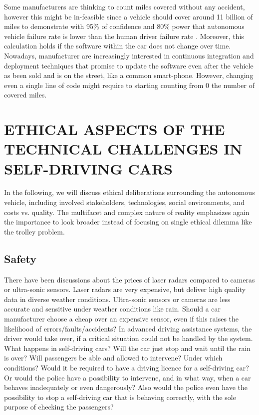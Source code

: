 Some manufacturers are thinking to count miles covered without any accident, however this might be in-feasible since a vehicle should cover around 11 billion of miles to demonstrate with 95\% of confidence and 80\% power that autonomous vehicle failure rate is lower than the human driver failure rate \cite{KALRA2016182}. Moreover, this calculation holds if the software within the car does not change over time. Nowadays, manufacturer are increasingly interested in continuous integration and deployment techniques that promise to update the software even after the vehicle as been sold and is on the street, like a common smart-phone. However, changing even a single line of code might require to starting counting from 0 the number of covered miles.


\section{ETHICAL ASPECTS OF THE TECHNICAL CHALLENGES IN SELF-DRIVING CARS}
\label{sec:EAofTC}

In the following, we will discuss ethical deliberations surrounding the autonomous vehicle, including involved stakeholders, technologies, social environments, and costs vs. quality. The multifacet and complex nature of reality emphasizes again the importance to look broader instead of focusing on single ethical dilemma like the trolley problem.

\subsection{Safety}
\label{sec:EAofTC:Safety}

There have been discussions about the prices of laser radars compared to cameras or ultra-sonic sensors. Laser radars are very expensive, but deliver high quality data in diverse weather conditions. Ultra-sonic sensors or cameras are less accurate and sensitive under weather conditions like rain. 
Should a car manufacturer choose a cheap over an expensive sensor, even if this raises the likelihood of errors/faults/accidents? In advanced driving assistance systems, the driver would take over, if a critical situation could not be handled by the system. What happens in self-driving cars? Will the car just stop and wait until the rain is over? Will passengers be able and allowed to intervene? Under which conditions? Would it be required to have a driving licence for a self-driving car? Or would the police have a possibility to intervene, and in what way, when a car behaves inadequately or even dangerously? Also would the police even have the possibility to stop a self-driving car that is behaving correctly, with the sole purpose of checking the passengers?

